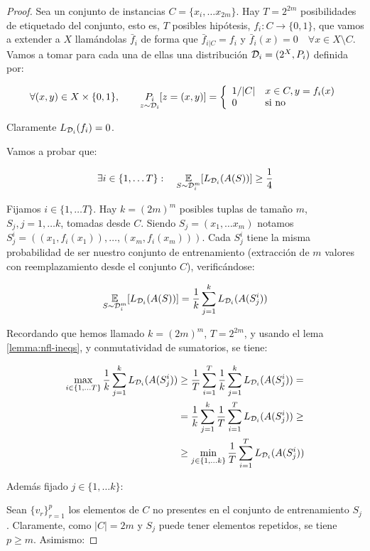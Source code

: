 \begin{proof}
Sea un conjunto de instancias $C=\{x_i, \ldots x_{2m}\}$. Hay $T = 2^{2m}$ posibilidades de etiquetado del conjunto,
esto es, $T$ posibles hipótesis, $f_i: C\rightarrow \{0,1\}$, que vamos a extender a $X$ llamándolas $\bar{f}_i$
de forma que $\bar{f}_{i|C} = f_i$ y $\bar{f}_i(x) = 0 \quad \forall x\in X\setminus C$. 
Vamos a tomar para cada una de ellas una distribución $\mathcal{D}_i=(2^X, P_i)$ definida por:


\[\forall (x,y)\in X \times \{0,1\}, \qquad \underset{z\sim \mathcal{D}_i}{P_i} [z = (x,y)] = 
  \left\{\begin{array}{ll}
	 1/|C| & x \in C, y=f_i(x)\\
	 0     & \textrm{si no}
  \end{array}\right. \]

Claramente $L_{\mathcal{D}_i}(f_i) = 0$.

Vamos a probar que:

\[\exists i\in \{1, \ldots T\} : \quad \underset{S\sim \mathcal{D}_{i}^m}{\mathbb{E}} [L_{\mathcal{D}_i} (A(S))] \ge \frac{1}{4}\]

Fijamos $i \in \{1, \ldots T\}$. Hay $k = (2m)^m$ posibles tuplas de tamaño $m$, $S_{j}, j=1, \ldots k$, tomadas 
desde $C$. Siendo $S_j = (x_1, \ldots x_m)$ notamos $S_j^i = ((x_1, f_i(x_1)), \ldots, (x_m, f_i(x_m)))$. Cada 
$S_j^i$ tiene la misma probabilidad de ser nuestro conjunto de entrenamiento (extracción de $m$ valores con 
reemplazamiento desde el conjunto $C$), verificándose:

\[\underset{S\sim \mathcal{D}_{i}^m}{\mathbb{E}} [L_{\mathcal{D}_i} (A(S))] = \frac{1}{k} \sum_{j=1}^k L_{\mathcal{D}_i} (A(S_j^i))\]

Recordando que hemos llamado $k=(2m)^m$, $T=2^{2m}$, y usando el lema \ref{lemma:nfl-ineqs}, y conmutatividad
de sumatorios, se tiene:

\begin{align}
\max_{i \in \{1,\ldots T\}} \frac{1}{k} \sum_{j=1}^{k} L_{\mathcal{D}_i} (A(S_j^i)) &\ge \nonumber
       \frac{1}{T} \sum_{i=1}^{T} \frac{1}{k} \sum_{j=1}^{k}  L_{\mathcal{D}_i} (A(S_j^i))   =\\
&=     \frac{1}{k} \sum_{j=1}^{k} \frac{1}{T} \sum_{i=1}^{T}  L_{\mathcal{D}_i} (A(S_j^i)) \ge \nonumber\\
&\ge \min_{j \in \{1, \ldots k\}} \frac{1}{T} \sum_{i=1}^{T}  L_{\mathcal{D}_i} (A(S_j^i)) \label{eqn:nfl-ineqs1}
\end{align}


Además fijado $j \in \{1,\ldots k\}$:

Sean $\{v_r\}_{r=1}^p$ los elementos de $C$ no presentes en el conjunto de entrenamiento $S_j$. 
Claramente, como $|C|=2m$ y $S_j$ puede tener elementos repetidos, se tiene $p \ge m$. Asimismo:


\end{proof}
